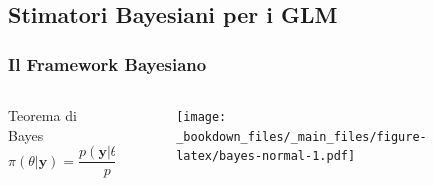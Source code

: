 \documentclass[pdf, aspectratio=169]{beamer}\usepackage[]{graphicx}\usepackage[]{color}
\theoremstyle{definition}
\begin{document}
\subsection{Stimatori Bayesiani per i GLM}

\begin{frame}
\frametitle{Il Framework Bayesiano}

\begin{columns}

\begin{column}{0.3\linewidth}
  \begin{block}{Teorema di Bayes}
  $$
  \pi(\theta|\boldsymbol{y}) = \frac{p(\boldsymbol{y}|\theta)\pi(\theta)}{p(\boldsymbol{y})}
  $$
  \end{block}
\end{column}

\begin{column}{0.7\linewidth}
  \begin{figure}
      \centering
      \texttt{[image: \_bookdown\_files/\_main\_files/figure-latex/bayes-normal-1.pdf]}
      \label{fig:bayes-normal}
    \end{figure}
\end{column}

\end{columns}


\end{frame}
\end{document}
